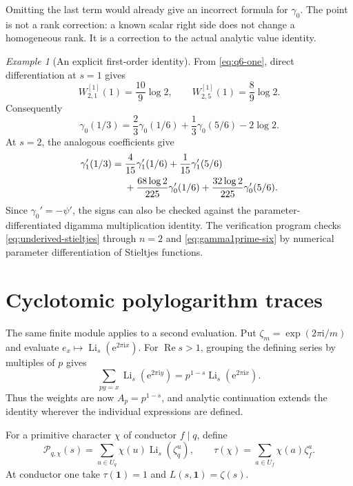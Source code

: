 \documentclass[11pt]{article}
\numberwithin{equation}{section}
\theoremstyle{definition}
\theoremstyle{remark}
\newtheorem{example}[theorem]{Example}
\DeclareMathOperator{\Li}{Li}
\DeclareMathOperator{\Ree}{Re}
\newcommand{\ee}{\mathrm e}
\newcommand{\ii}{\mathrm i}
\newcommand{\cP}{\mathcal P}
\begin{document}
Omitting the last term would already give an incorrect formula for
$\gamma_0$. The point is not a rank correction: a known scalar right
side does not change a homogeneous rank. It is a correction to the
actual analytic value identity.

\begin{example}[An explicit first-order identity]
From \eqref{eq:q6-one}, direct differentiation at $s=1$ gives
\[
 W_{2,1}^{[1]}(1)=\frac{10}{9}\log2,\qquad
 W_{2,5}^{[1]}(1)=\frac89\log2.
\]
Consequently
\begin{equation}\label{eq:gamma0-six}
 \gamma_0(1/3)=\frac23\gamma_0(1/6)+\frac13\gamma_0(5/6)-2\log2.
\end{equation}
At $s=2$, the analogous coefficients give
\begin{align}\label{eq:gamma1prime-six}
 \gamma_1'(1/3)={}&\frac4{15}\gamma_1'(1/6)
 +\frac1{15}\gamma_1'(5/6)\notag\\
 &+\frac{68\log2}{225}\gamma_0'(1/6)
 +\frac{32\log2}{225}\gamma_0'(5/6).
\end{align}
Since $\gamma_0'=-\psi'$, the signs can also be checked against the
parameter-differentiated digamma multiplication identity.
The verification program checks \eqref{eq:underived-stieltjes} through
$n=2$ and \eqref{eq:gamma1prime-six} by numerical parameter
differentiation of Stieltjes functions.
\end{example}

\section{Cyclotomic polylogarithm traces}\label{sec:traces}

The same finite module applies to a second evaluation. Put
$\zeta_m=\exp(2\pi\ii/m)$ and evaluate
$e_x\mapsto\Li_s(\ee^{2\pi\ii x})$.
For $\Ree s>1$, grouping the defining series by multiples of $p$ gives
\[
 \sum_{py=x}\Li_s(\ee^{2\pi\ii y})
 =p^{1-s}\Li_s(\ee^{2\pi\ii x}).
\]
Thus the weights are now $A_p=p^{1-s}$, and analytic continuation
extends the identity wherever the individual expressions are defined.

For a primitive character $\chi$ of conductor $f\mid q$, define
\begin{equation}\label{eq:trace-definition}
 \cP_{q,\chi}(s)=
 \sum_{u\in U_q}\chi(u)\Li_s(\zeta_q^u),\qquad
 \tau(\chi)=\sum_{a\in U_f}\chi(a)\zeta_f^a.
\end{equation}
At conductor one take $\tau(\mathbf1)=1$ and $L(s,\mathbf1)=\zeta(s)$.
\end{document}
